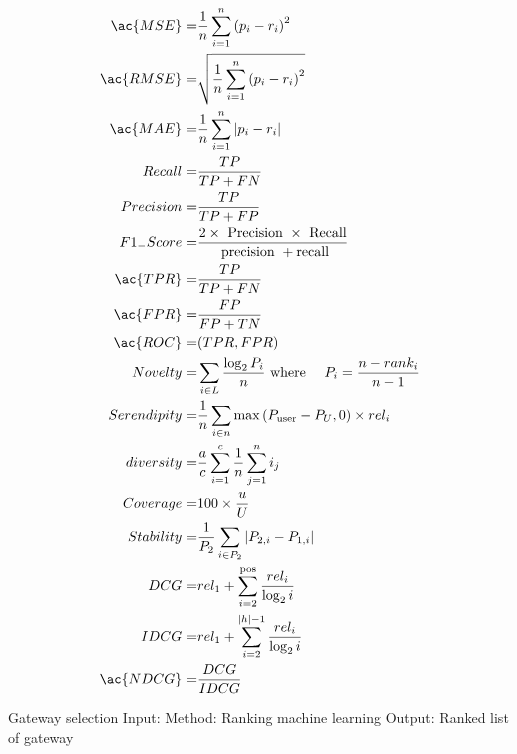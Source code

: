 \begin{align}
\ac{MSE}=         & \frac{1}{n} \sum_{i=1}^{n}\left(p_{i}-r_{i}\right)^{2} \\
\ac{RMSE}=        & \sqrt{\frac{1}{n} \sum_{i=1}^{n}\left(p_{i}-r_{i}\right)^{2}} \\
\ac{MAE}=         & \frac{1}{n} \sum_{i=1}^{n}\left|p_{i}-r_{i}\right| \\
Recall=      & \frac{T P}{T P+F N} \\
Precision=   & \frac{T P}{T P+F P} \\
F1_{-}Score= & \frac{2 \times \text { Precision } \times \text { Recall}}{\text { precision }+\text {recall}} \\
\ac{TPR} =        & \frac{T P}{T P+F N} \\
\ac{FPR} =        & \frac{F P}{F P+T N} \\
\ac{ROC}=& (TPR,FPR)\\
Novelty=     & \sum_{i \in L} \frac{\log _{2} P_{i}}{n} \text { where } \quad P_{i}=\frac{n-r a n k_{i}}{n-1} \\
Serendipity= & \frac{1}{n} \sum_{i \in n} \max \left(P_{\text {user}}-P_{U}, 0\right) \times r e l_{i} \\
diversity=   & \frac{a}{c} \sum_{i=1}^{c} \frac{1}{n} \sum_{j=1}^{n} i_{j} \\
Coverage=    & 100 \times \frac{u}{U} \\
Stability=   & \frac{1}{P_{2}} \sum_{i \in P_{2}}\left|P_{2, i}-P_{1, i}\right| \\
DCG=         & r e l_{1}+\sum_{i=2}^{\text {pos}} \frac{r e l_{i}}{\log _{2} i} \\
IDCG=        & r e l_{1}+\sum_{i=2}^{|h|-1} \frac{r e l_{i}}{\log _{2} i} \\
\ac{NDCG}=        & \frac{D C G}{I D C G} \\
\end{align}




Gateway selection
Input:
Method:
	Ranking machine learning
Output:
	Ranked list of gateway












